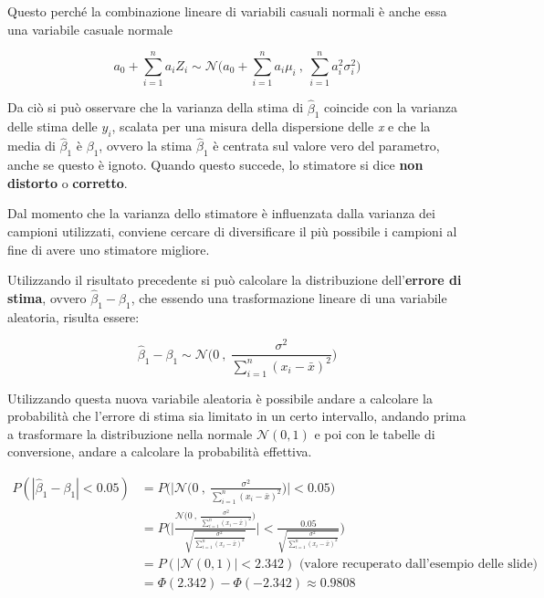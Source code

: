 Questo perché la combinazione lineare di variabili casuali normali è anche essa una variabile casuale normale

$$
a_0 + \sum\limits_{i = 1}^n a_i Z_i \sim \mathcal{N}\bigg(a_0 + \sum\limits_{i=1}^n a_i\mu_i \: , \: \sum\limits_{i=1}^n a_{i}^2 \sigma_{i}^2\bigg)
$$

Da ciò si può osservare che la varianza della stima di $ \hat{\beta}_1  $ coincide con la varianza delle stima delle $ y_i $, scalata per una misura della dispersione delle \textit{x} e che la media di $ \hat{\beta}_1  $ è $ \beta_1 $, ovvero la stima $ \hat{\beta}_1  $ è centrata sul valore vero del parametro, anche se questo è ignoto. Quando questo succede, lo stimatore si dice \textbf{non distorto} o \textbf{corretto}. 

Dal momento che la varianza dello stimatore è influenzata dalla varianza dei campioni utilizzati, conviene cercare di diversificare il più possibile i campioni al fine di avere uno stimatore migliore.

Utilizzando il risultato precedente si può calcolare la distribuzione dell'\textbf{errore di stima}, ovvero $ \hat{\beta}_1  - \beta_1 $, che essendo una trasformazione lineare di una variabile aleatoria, risulta essere:

$$
\hat{\beta}_1 - \beta_1 \sim \mathcal{N}\Bigg(0 \: ,\: \frac{\sigma^2}{\sum_{i=1}^n (x_i - \bar{x})^2}\Bigg)
$$

Utilizzando questa nuova variabile aleatoria è possibile andare a calcolare la probabilità che l'errore di stima sia limitato in un certo intervallo, andando prima a trasformare la distribuzione nella normale $ \mathcal{N}(0,1) $ e poi con le tabelle di conversione, andare a calcolare la probabilità effettiva.

\begin{align*}
	P(|\hat{\beta}_1  - \beta_1| < 0.05) &= P\Bigg(\Bigg|\mathcal{N}\bigg(0 \:, \: \frac{\sigma^2}{\sum_{i=1}^n (x_i - \bar{x})^2}\bigg)\Bigg| < 0.05\Bigg) \\
																  &= P\Bigg(\Bigg|\frac{\mathcal{N}\bigg(0\:,\: \frac{\sigma^2}{\sum_{i=1}^n (x_i - \bar{x})^2}\bigg)}{\sqrt{\frac{\sigma^2}{\sum_{i=1}^n (x_i - \bar{x})^2}}}\Bigg| < \frac{0.05}{\sqrt{\frac{\sigma^2}{\sum_{i=1}^n (x_i - \bar{x})^2}}}\Bigg) \\
																  &= P(|\mathcal{N}(0,1)| < 2.342) \text{ (valore recuperato dall'esempio delle slide)} \\
																  &= \Phi(2.342) - \Phi(-2.342) \approx 0.9808\
\end{align*}

